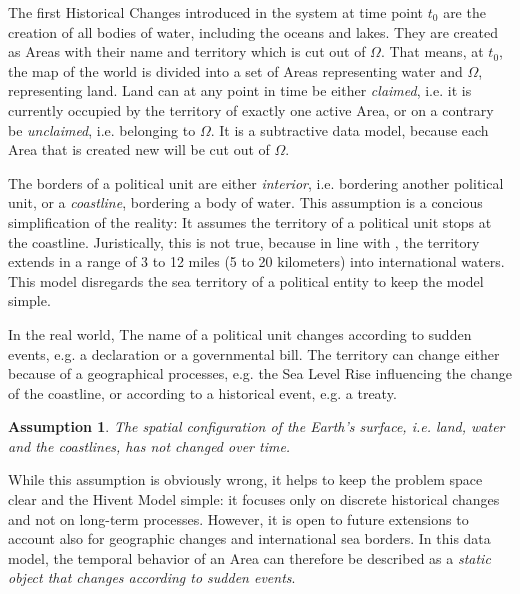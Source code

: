 The first Historical Changes introduced in the system at time point $t_0$ are the creation of all bodies of water, including the oceans and lakes. They are created as Areas with their name and territory which is cut out of $\Omega$. That means, at $t_0$, the map of the world is divided into a set of Areas representing water and $\Omega$, representing land. Land can at any point in time be either \emph{claimed}, i.e. it is currently occupied by the territory of exactly one active Area, or on a contrary be \emph{unclaimed}, i.e. belonging to $\Omega$. It is a subtractive data model, because each Area that is created new will be cut out of $\Omega$.

The borders of a political unit are either \emph{interior}, i.e. bordering another political unit, or a \emph{coastline}, bordering a body of water. This assumption is a concious simplification of the reality: It assumes the territory of a political unit stops at the coastline. Juristically, this is not true, because in line with \cite{UNSeaBorders}, the territory extends in a range of 3 to 12 miles (5 to 20 kilometers) into international waters. This model disregards the sea territory of a political entity to keep the model simple.

In the real world, The name of a political unit changes according to sudden events, e.g. a declaration or a governmental bill. The territory can change either because of a geographical processes, e.g. the Sea Level Rise influencing the change of the coastline, or according to a historical event, e.g. a treaty.

\newtheorem{constant_coastlines}[assicounter]{Assumption}
\begin{constant_coastlines}
\label{axm:constant_coastlines}
  The spatial configuration of the Earth's surface, i.e. land, water and the coastlines, has not changed over time.
\end{constant_coastlines}

While this assumption is obviously wrong, it helps to keep the problem space clear and the Hivent Model simple: it focuses only on discrete historical changes and not on long-term processes. However, it is open to future extensions to account also for geographic changes and international sea borders. In this data model, the temporal behavior of an Area can therefore be described as a \emph{static object that changes according to sudden events}.


